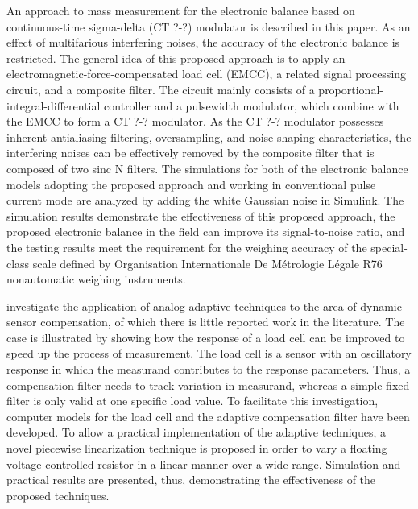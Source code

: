 \documentclass[11pt]{article}
\begin{document}
\citet{Huang16} An approach to mass measurement for the electronic balance based on continuous-time sigma-delta (CT ?-?) modulator is described in this paper. As an effect of multifarious interfering noises, the accuracy of the electronic balance is restricted. The general idea of this proposed approach is to apply an electromagnetic-force-compensated load cell (EMCC), a related signal processing circuit, and a composite filter. The circuit mainly consists of a proportional-integral-differential controller and a pulsewidth modulator, which combine with the EMCC to form a CT ?-? modulator. As the CT ?-? modulator possesses inherent antialiasing filtering, oversampling, and noise-shaping characteristics, the interfering noises can be effectively removed by the composite filter that is composed of two sinc N filters. The simulations for both of the electronic balance models adopting the proposed approach and working in conventional pulse current mode are analyzed by adding the white Gaussian noise in Simulink. The simulation results demonstrate the effectiveness of this proposed approach, the proposed electronic balance in the field can improve its signal-to-noise ratio, and the testing results meet the requirement for the weighing accuracy of the special-class scale defined by Organisation Internationale De M\'etrologie L\'egale R76 nonautomatic weighing instruments.

\citet{Jafaripanah05}  investigate the application of analog adaptive techniques to the area of dynamic sensor compensation, of which there is little reported work in the literature. The case is illustrated by showing how the response of a load cell can be improved to speed up the process of measurement. The load cell is a sensor with an oscillatory response in which the measurand contributes to the response parameters. Thus, a compensation filter needs to track variation in measurand, whereas a simple fixed filter is only valid at one specific load value. To facilitate this investigation, computer models for the load cell and the adaptive compensation filter have been developed. To allow a practical implementation of the adaptive techniques, a novel piecewise linearization technique is proposed in order to vary a floating voltage-controlled resistor in a linear manner over a wide range. Simulation and practical results are presented, thus, demonstrating the effectiveness of the proposed techniques.
\end{document}
